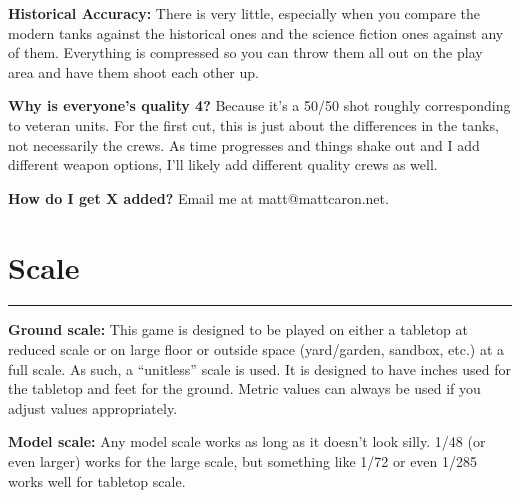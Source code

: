 \documentclass[11pt]{article}
\newcommand{\mysection}[1]{
  \section*{\centering #1}
  \raggedright
  \hrule
  \bigskip

}
\renewenvironment{description}
  {\list{}{\labelwidth=0pt \leftmargin=0pt
   \let\makelabel\descriptionlabel}}
  {\endlist}
\begin{document}
\begin{multicols*}{2}[]
\begin{description}
\columnbreak

\item{\bf Historical Accuracy:} There is very little, especially when you
  compare the modern tanks against the historical ones and the science
  fiction ones against any of them. Everything is compressed so you
  can throw them all out on the play area and have them shoot each
  other up.
\item{\bf Why is everyone’s quality 4?} Because it’s a 50/50 shot roughly
  corresponding to veteran units. For the first cut, this is just
  about the differences in the tanks, not necessarily the crews. As
  time progresses and things shake out and I add different weapon
  options, I’ll likely add different quality crews as well.
\item{\bf How do I get X added?} Email me at matt@mattcaron.net.
\end{description}

\mysection{Scale}
\begin{description}
\item {\bf Ground scale:} This game is designed to be played on either
  a tabletop at reduced scale or on large floor or outside space
  (yard/garden, sandbox, etc.) at a full scale. As such, a “unitless”
  scale is used. It is designed to have inches used for the tabletop
  and feet for the ground. Metric values can always be used if you
  adjust values appropriately.
\item{\bf Model scale:} Any model scale works as long as it doesn’t
  look silly. 1/48 (or even larger) works for the large scale, but
  something like 1/72 or even 1/285 works well for tabletop scale.
\end{description}

\end{multicols*}
\pagebreak
\end{document}
